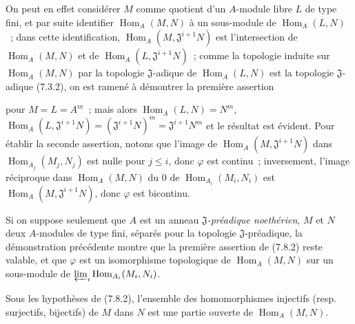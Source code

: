 On peut en effet considérer $M$ comme quotient d'un $A$-module libre $L$ de
type fini, et par suite identifier $\operatorname{Hom}_A(M,N)$ à un sous-module de
$\operatorname{Hom}_A(L,N)$~; dans cette identification,
$\operatorname{Hom}_A(M,\mathfrak J^{i+1}N)$ est l'intersection de $\operatorname{Hom}_A(M,N)$ et de
$\operatorname{Hom}_A(L,\mathfrak J^{i+1}N)$~; comme la topologie induite sur
$\operatorname{Hom}_A(M,N)$ par la topologie $\mathfrak J$-adique de $\operatorname{Hom}_A(L,N)$ est
la topologie $\mathfrak J$-adique (7.3.2), on est ramené à démontrer la
première assertion


pour $M=L=A^m$~; mais alors $\operatorname{Hom}_A(L,N)=N^m$,
$\operatorname{Hom}_A(L,\mathfrak J^{i+1}N)=(\mathfrak J^{i+1}N)^m=
\mathfrak J^{i+1}N^m$ et le résultat est évident. Pour établir la seconde
assertion, notons que l'image de $\operatorname{Hom}_A(M,\mathfrak J^{i+1}N)$ dans
$\operatorname{Hom}_{A_j}(M_j,N_j)$ est nulle pour $j\leq i$, donc $\varphi$ est
continu~; inversement, l'image réciproque dans $\operatorname{Hom}_A(M,N)$ du $0$ de
$\operatorname{Hom}_{A_i}(M_i,N_i)$ est $\operatorname{Hom}_A(M,\mathfrak J^{i+1}N)$, donc $\varphi$
est bicontinu.

Si on suppose seulement que $A$ est un anneau \emph{$\mathfrak J$-préadique
noethérien}, $M$ et $N$ deux $A$-modules de type fini, séparés pour la
topologie $\mathfrak J$-préadique, la démonstration précédente montre que
la première assertion de (7.8.2) reste valable, et que $\varphi$ est un
isomorphisme topologique de $\operatorname{Hom}_A(M,N)$ sur un sous-module de
$\varprojlim_i\operatorname{Hom}_{A_i}(M_i,N_i)$.

\begin{proposition}[7.8.3]
\label{0.7.8.3-fr}
Sous les hypothèses de \textup{(7.8.2)}, l'ensemble des homomorphismes injectifs
\textup{(resp.} surjectifs, bijectifs) de $M$ dans $N$ est une partie ouverte de
$\operatorname{Hom}_A(M,N)$.
\end{proposition}

